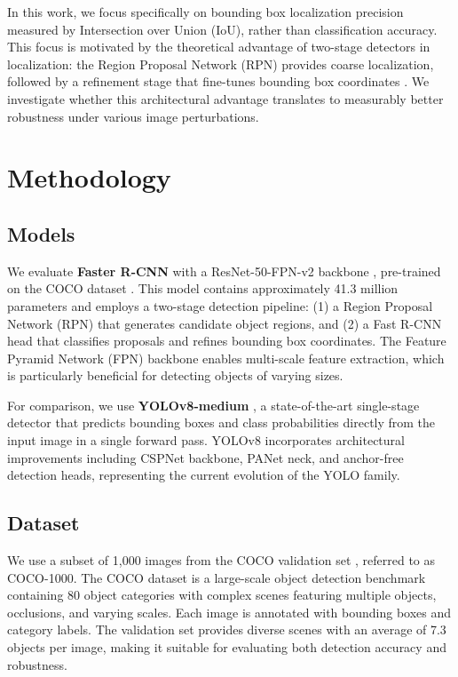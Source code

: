 \documentclass[conference]{IEEEtran}
\begin{document}
In this work, we focus specifically on bounding box localization precision measured by Intersection over Union (IoU), rather than classification accuracy. This focus is motivated by the theoretical advantage of two-stage detectors in localization: the Region Proposal Network (RPN) provides coarse localization, followed by a refinement stage that fine-tunes bounding box coordinates \cite{ren2015faster}. We investigate whether this architectural advantage translates to measurably better robustness under various image perturbations.

\section{Methodology}

\subsection{Models}

We evaluate \textbf{Faster R-CNN} with a ResNet-50-FPN-v2 backbone \cite{he2016resnet, lin2017fpn}, pre-trained on the COCO dataset \cite{lin2014coco}. This model contains approximately 41.3 million parameters and employs a two-stage detection pipeline: (1) a Region Proposal Network (RPN) that generates candidate object regions, and (2) a Fast R-CNN head that classifies proposals and refines bounding box coordinates. The Feature Pyramid Network (FPN) backbone enables multi-scale feature extraction, which is particularly beneficial for detecting objects of varying sizes.

For comparison, we use \textbf{YOLOv8-medium} \cite{jocher2023yolov8}, a state-of-the-art single-stage detector that predicts bounding boxes and class probabilities directly from the input image in a single forward pass. YOLOv8 incorporates architectural improvements including CSPNet backbone, PANet neck, and anchor-free detection heads, representing the current evolution of the YOLO family.

\subsection{Dataset}

We use a subset of 1,000 images from the COCO validation set \cite{lin2014coco}, referred to as COCO-1000. The COCO dataset is a large-scale object detection benchmark containing 80 object categories with complex scenes featuring multiple objects, occlusions, and varying scales. Each image is annotated with bounding boxes and category labels. The validation set provides diverse scenes with an average of 7.3 objects per image, making it suitable for evaluating both detection accuracy and robustness.
\end{document}
